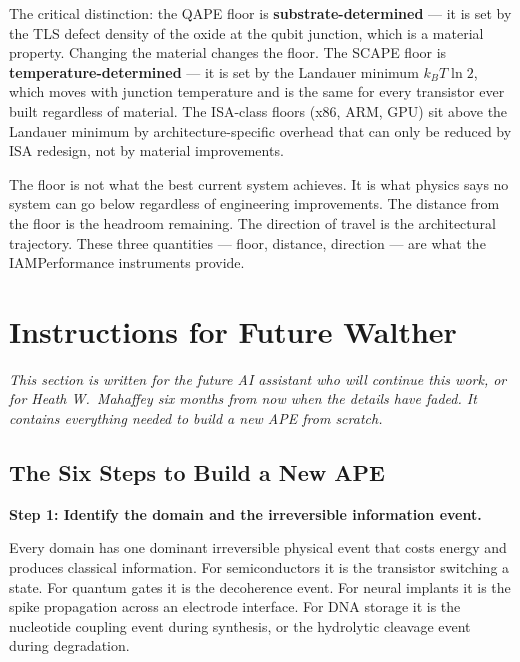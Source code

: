 \documentclass[12pt,a4paper]{article}
\begin{document}
The critical distinction: the QAPE floor is \textbf{substrate-determined} ---
it is set by the TLS defect density of the oxide at the qubit junction, which
is a material property. Changing the material changes the floor. The SCAPE
floor is \textbf{temperature-determined} --- it is set by the Landauer minimum
$k_B T \ln 2$, which moves with junction temperature and is the same for every
transistor ever built regardless of material. The ISA-class floors (x86, ARM,
GPU) sit above the Landauer minimum by architecture-specific overhead that can
only be reduced by ISA redesign, not by material improvements.

The floor is not what the best current system achieves. It is what physics
says no system can go below regardless of engineering improvements. The distance
from the floor is the headroom remaining. The direction of travel is the
architectural trajectory. These three quantities --- floor, distance, direction
--- are what the IAMPerformance instruments provide.

\newpage

\section{Instructions for Future Walther}

\noindent
\textit{This section is written for the future AI assistant who will continue
this work, or for Heath W.\ Mahaffey six months from now when the details have
faded. It contains everything needed to build a new APE from scratch.}

\subsection{The Six Steps to Build a New APE}

\textbf{Step 1: Identify the domain and the irreversible information event.}

Every domain has one dominant irreversible physical event that costs energy
and produces classical information. For semiconductors it is the transistor
switching a state. For quantum gates it is the decoherence event. For neural
implants it is the spike propagation across an electrode interface. For DNA
storage it is the nucleotide coupling event during synthesis, or the hydrolytic
cleavage event during degradation.
\end{document}
